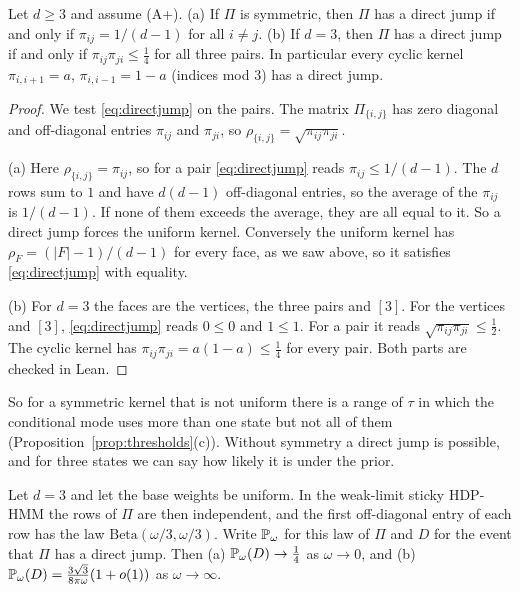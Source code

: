 \begin{corollary}\label{cor:uniform-kernel}
Let $d\ge3$ and assume \textup{(A+)}. \textup{(a)} If $\Pi$ is symmetric,
then $\Pi$ has a direct jump if and only if $\pi_{ij}=1/(d-1)$ for all
$i\ne j$. \textup{(b)} If $d=3$, then $\Pi$ has a direct jump if and only if
$\pi_{ij}\pi_{ji}\le\frac14$ for all three pairs. In particular every cyclic
kernel $\pi_{i,i+1}=a$, $\pi_{i,i-1}=1-a$ (indices mod $3$) has a direct
jump.
\end{corollary}

\begin{proof}
We test \eqref{eq:directjump} on the pairs. The matrix $\Pi_{\{i,j\}}$ has
zero diagonal and off-diagonal entries $\pi_{ij}$ and $\pi_{ji}$, so
$\rho_{\{i,j\}}=\sqrt{\pi_{ij}\pi_{ji}}$.

(a) Here $\rho_{\{i,j\}}=\pi_{ij}$, so for a pair \eqref{eq:directjump} reads
$\pi_{ij}\le1/(d-1)$. The $d$ rows sum to $1$ and have $d(d-1)$ off-diagonal
entries, so the average of the $\pi_{ij}$ is $1/(d-1)$. If none of them
exceeds the average, they are all equal to it. So a direct jump forces the
uniform kernel. Conversely the uniform kernel has $\rho_F=(|F|-1)/(d-1)$ for
every face, as we saw above, so it satisfies \eqref{eq:directjump} with
equality.

(b) For $d=3$ the faces are the vertices, the three pairs and $[3]$. For the
vertices and $[3]$, \eqref{eq:directjump} reads $0\le0$ and $1\le1$. For a
pair it reads $\sqrt{\pi_{ij}\pi_{ji}}\le\frac12$. The cyclic kernel has
$\pi_{ij}\pi_{ji}=a(1-a)\le\frac14$ for every pair. Both parts are checked in
Lean.
\end{proof}

So for a symmetric kernel that is not uniform there is a range of $\tau$ in
which the conditional mode uses more than one state but not all of them
(Proposition~\ref{prop:thresholds}(c)). Without symmetry a direct jump is
possible, and for three states we can say how likely it is under the prior.

\begin{proposition}\label{prop:directjump}
Let $d=3$ and let the base weights be uniform. In the weak-limit sticky
HDP-HMM the rows of $\Pi$ are then independent, and the first off-diagonal
entry of each row has the law $\mathrm{Beta}(\omega/3,\omega/3)$. Write
$\mathbb P_\omega$ for this law of $\Pi$ and $D$ for the event that $\Pi$ has a
direct jump. Then \textup{(a)} $\mathbb P_\omega(D)\to\frac14$ as $\omega\to0$,
and \textup{(b)} $\mathbb P_\omega(D)=\frac{3\sqrt3}{8\pi\omega}(1+o(1))$ as
$\omega\to\infty$.
\end{proposition}

